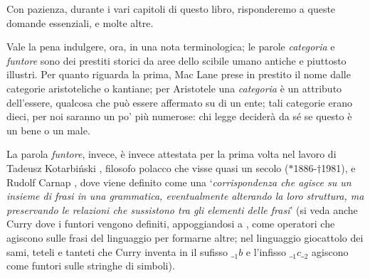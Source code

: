 \medskip
Con pazienza, durante i vari capitoli di questo libro, risponderemo a queste domande essenziali, e molte altre.

\medskip
Vale la pena indulgere, ora, in una nota terminologica; le parole \emph{categoria} e \emph{funtore} sono dei prestiti storici da aree dello scibile umano antiche e piuttosto illustri. Per quanto riguarda la prima, Mac Lane prese in prestito il nome dalle categorie aristoteliche o kantiane; per Aristotele \cite{Barnes2014-wz} una \emph{categoria} è un attributo dell'essere, qualcosa che può essere affermato su di un ente; tali categorie erano dieci, per noi saranno un po' più numerose: chi legge deciderà da sé se questo è un bene o un male.

La parola \emph{funtore}, invece, è invece attestata per la prima volta nel lavoro di Tadeusz Kotarbi\'nski \cite{kotarbione}, filosofo polacco che visse quasi un secolo (\(*\)1886-\(\dag\)1981), e Rudolf Carnap \cite{carnappio}, dove viene definito come una `\emph{corrispondenza che agisce su un insieme di frasi in una grammatica, eventualmente alterando la loro struttura, ma preservando le relazioni che sussistono tra gli elementi delle frasi}' (si veda anche Curry \cite{Curry1961SomeLA} dove i funtori vengono definiti, appoggiandosi a \cite{kotarbione}, come operatori che agiscono sulle frasi del linguaggio per formarne altre; nel linguaggio giocattolo dei sami, teteli e tanteti che Curry inventa in \cite{Curry1961SomeLA} il sufisso \({\_}_1b\) e l'infisso \({\_}_1 c {\_}_2\) agiscono come funtori sulle stringhe di simboli).

